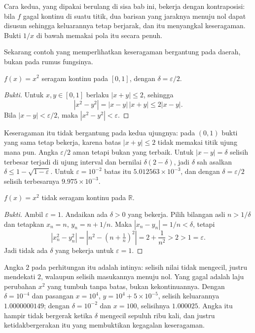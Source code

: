 Cara kedua, yang dipakai berulang di sisa bab ini, bekerja dengan kontraposisi: bila
$f$ gagal kontinu di suatu titik, dua barisan yang jaraknya menuju nol dapat disusun
sehingga keluarannya tetap berjarak, dan itu menyangkal keseragaman. Bukti $1/x$ di
bawah memakai pola itu secara penuh.

Sekarang contoh yang memperlihatkan keseragaman bergantung pada daerah, bukan pada
rumus fungsinya.

\begin{proposisi}
$f(x)=x^{2}$ seragam kontinu pada $[0,1]$, dengan $\delta=\varepsilon/2$.
\end{proposisi}

\begin{proof}[Bukti]
Untuk $x,y\in[0,1]$ berlaku $|x+y|\le 2$, sehingga
\[
|x^{2}-y^{2}|=|x-y|\,|x+y|\le 2|x-y| .
\]
Bila $|x-y|<\varepsilon/2$, maka $|x^{2}-y^{2}|<\varepsilon$.
\end{proof}

Keseragaman itu tidak bergantung pada kedua ujungnya: pada $(0,1)$ bukti yang sama
tetap bekerja, karena batas $|x+y|\le 2$ tidak memakai titik ujung mana pun. Angka
$\varepsilon/2$ aman tetapi bukan yang terbaik. Untuk $|x-y|=\delta$ selisih
terbesar terjadi di ujung interval dan bernilai $\delta(2-\delta)$, jadi $\delta$ sah
asalkan $\delta\le 1-\sqrt{1-\varepsilon}$. Untuk $\varepsilon=10^{-2}$ batas itu
$5.012563\times10^{-3}$, dan dengan $\delta=\varepsilon/2$ selisih terbesarnya
$9.975\times10^{-3}$.

\begin{proposisi}
$f(x)=x^{2}$ tidak seragam kontinu pada $\mathbb{R}$.
\end{proposisi}

\begin{proof}[Bukti]
Ambil $\varepsilon=1$. Andaikan ada $\delta>0$ yang bekerja. Pilih bilangan asli
$n>1/\delta$ dan tetapkan $x_{n}=n$, $y_{n}=n+1/n$. Maka $|x_{n}-y_{n}|=1/n<\delta$,
tetapi
\[
|x_{n}^{2}-y_{n}^{2}|=\left|n^{2}-\left(n+\tfrac1n\right)^{2}\right|
=2+\frac{1}{n^{2}}>2>1=\varepsilon .
\]
Jadi tidak ada $\delta$ yang bekerja untuk $\varepsilon=1$.
\end{proof}

Angka $2$ pada perhitungan itu adalah intinya: selisih nilai tidak mengecil, justru
mendekati $2$, walaupun selisih masukannya menuju nol. Yang gagal adalah laju
perubahan $x^{2}$ yang tumbuh tanpa batas, bukan kekontinuannya. Dengan
$\delta=10^{-4}$ dan pasangan $x=10^{4}$, $y=10^{4}+5\times10^{-5}$, selisih
keluarannya $1.0000000149$; dengan $\delta=10^{-2}$ dan $x=100$, selisihnya
$1.000025$. Angka itu hampir tidak bergerak ketika $\delta$ mengecil sepuluh ribu
kali, dan justru ketidakbergerakan itu yang membuktikan kegagalan keseragaman.

